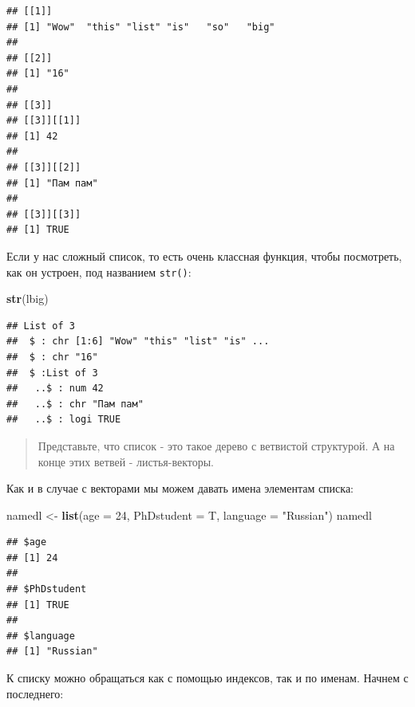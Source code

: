 \documentclass[]{book}
\newenvironment{Shaded}{\begin{snugshade}}{\end{snugshade}}
\newcommand{\KeywordTok}[1]{\textcolor[rgb]{0.13,0.29,0.53}{\textbf{#1}}}
\newcommand{\DataTypeTok}[1]{\textcolor[rgb]{0.13,0.29,0.53}{#1}}
\newcommand{\DecValTok}[1]{\textcolor[rgb]{0.00,0.00,0.81}{#1}}
\newcommand{\StringTok}[1]{\textcolor[rgb]{0.31,0.60,0.02}{#1}}
\newcommand{\OperatorTok}[1]{\textcolor[rgb]{0.81,0.36,0.00}{\textbf{#1}}}
\newcommand{\NormalTok}[1]{#1}
\begin{document}
\begin{verbatim}
## [[1]]
## [1] "Wow"  "this" "list" "is"   "so"   "big" 
## 
## [[2]]
## [1] "16"
## 
## [[3]]
## [[3]][[1]]
## [1] 42
## 
## [[3]][[2]]
## [1] "Пам пам"
## 
## [[3]][[3]]
## [1] TRUE
\end{verbatim}

Если у нас сложный список, то есть очень классная функция, чтобы
посмотреть, как он устроен, под названием \texttt{str()}:

\begin{Shaded}
\begin{Highlighting}[]
\KeywordTok{str}\NormalTok{(lbig)}
\end{Highlighting}
\end{Shaded}

\begin{verbatim}
## List of 3
##  $ : chr [1:6] "Wow" "this" "list" "is" ...
##  $ : chr "16"
##  $ :List of 3
##   ..$ : num 42
##   ..$ : chr "Пам пам"
##   ..$ : logi TRUE
\end{verbatim}

\begin{quote}
Представьте, что список - это такое дерево с ветвистой структурой. А на
конце этих ветвей - листья-векторы.
\end{quote}

Как и в случае с векторами мы можем давать имена элементам списка:

\begin{Shaded}
\begin{Highlighting}[]
\NormalTok{namedl <-}\StringTok{ }\KeywordTok{list}\NormalTok{(}\DataTypeTok{age =} \DecValTok{24}\NormalTok{, }\DataTypeTok{PhDstudent =}\NormalTok{ T, }\DataTypeTok{language =} \StringTok{"Russian"}\NormalTok{)}
\NormalTok{namedl}
\end{Highlighting}
\end{Shaded}

\begin{verbatim}
## $age
## [1] 24
## 
## $PhDstudent
## [1] TRUE
## 
## $language
## [1] "Russian"
\end{verbatim}

К списку можно обращаться как с помощью индексов, так и по именам.
Начнем с последнего:

\begin{Shaded}
\end{Shaded}
\end{document}
